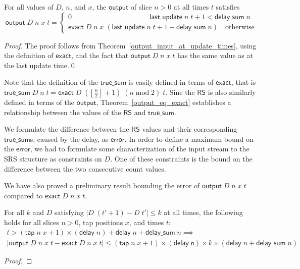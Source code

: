 \documentclass{llncs}
\begin{document}
\begin{theorem}\label{output_eq_exact}
For all values of $D$, $n$, and $x$, the $\mathsf{output}$ of slice $n>0$ at all times $t$ satisfies
\begin{equation*}
\mathsf{output}\;D\;n\;x\;t=\begin{cases}0\qquad\qquad\qquad\qquad\qquad\quad\mathsf{last\_update}\;n\;t+1<\mathsf{delay\_sum}\;n\\\mathsf{exact}\;D\;n\;x\;(\mathsf{last\_update}\;n\;t+1-\mathsf{delay\_sum}\;n)\quad\text{otherwise}\end{cases}
\end{equation*}
\end{theorem}
\begin{proof}
The proof follows from Theorem~\ref{output_input_at_update_times}, using the definition of $\mathsf{exact}$, and the fact that $\mathsf{output}\;D\;n\;x\;t$ has the same value as at the last update time.\qed
\end{proof}

Note that the definition of the $\mathsf{true\_sum}$ is easily defined in terms of $\mathsf{exact}$, that is $\mathsf{true\_sum}\;D\;n\;t = \mathsf{exact}\;D\;\left(\left\lfloor\frac{n}{2}\right\rfloor+1\right)\;(n\operatorname{mod}2)\;t$.
Sine the $\mathsf{RS}$ is also similarly defined in terms of the $\mathsf{output}$, Theorem~\ref{output_eq_exact} establishes a relationship between the values of the $\mathsf{RS}$ and $\mathsf{true\_sum}$.

We formulate the difference between the $\mathsf{RS}$ values and their corresponding $\mathsf{true\_sum}$s, caused by the delay, as $\mathsf{error}$. 
In order to define a maximum bound on the $\mathsf{error}$, we had to formulate some characterization of the input stream to the SRS structure as constraints on $D$.
One of these constraints is the bound on the difference between the two consecutive count values.


We have also proved a preliminary result bounding the error of $\mathsf{output}\;D\;n\;x\;t$ compared to $\mathsf{exact}\;D\;n\;x\;t$.
\begin{theorem}\label{max_error}
For all $k$ and $D$ satisfying $|D\;(t'+1)-D\;t'|\leq k$ at all times, the following holds for all slices $n>0$, tap positions $x$, and times $t$:
\begin{multline*}
t>(\mathsf{tap}\;n\;x+1)\times(\mathsf{delay}\;n)+\mathsf{delay}\;n+\mathsf{delay\_sum}\;n\implies\\
|\mathsf{output}\;D\;n\;x\;t-\mathsf{exact}\;D\;n\;x\;t|\leq(\mathsf{tap}\;n\;x+1)\times(\mathsf{delay\;n})\times k\times(\mathsf{delay}\;n+\mathsf{delay\_sum}\;n)
\end{multline*}
\end{theorem}
\begin{proof}
\end{proof}
\end{document}
